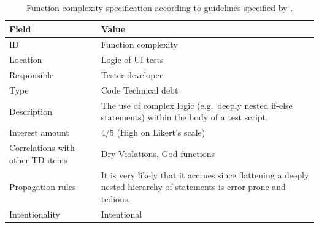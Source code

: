 	\begin{table}[!htbp]
		\centering
		\tabulinesep=1.2mm
		\begin{tabu} to \textwidth {|X|X[3]|}

			\hline
			\textbf{Field} & \textbf{Value} \\
			\hline

			ID & Function complexity \\
			\hline

			Location & Logic of UI tests \\
			\hline

			Responsible & Tester developer \\
			\hline

			Type & Code Technical debt \\
			\hline

			Description & The use of complex logic (e.g.\ deeply nested if-else statements) within the body of a test script.\\
			\hline



			Interest amount &  4/5 (High on Likert's scale) \\
			\hline



			Correlations with other TD items & Dry Violations, God functions\\
			\hline



			Propagation rules & It is very likely that it accrues since flattening a deeply nested hierarchy of statements is error-prone and tedious.\\
			\hline

			Intentionality & Intentional \\
			\hline

		\end{tabu}
		\label{tab:res-function-complexity}
		\caption[Function complexity specification]{Function complexity specification according to guidelines specified by \cite{mapping_study_td}.}
	\end{table}



